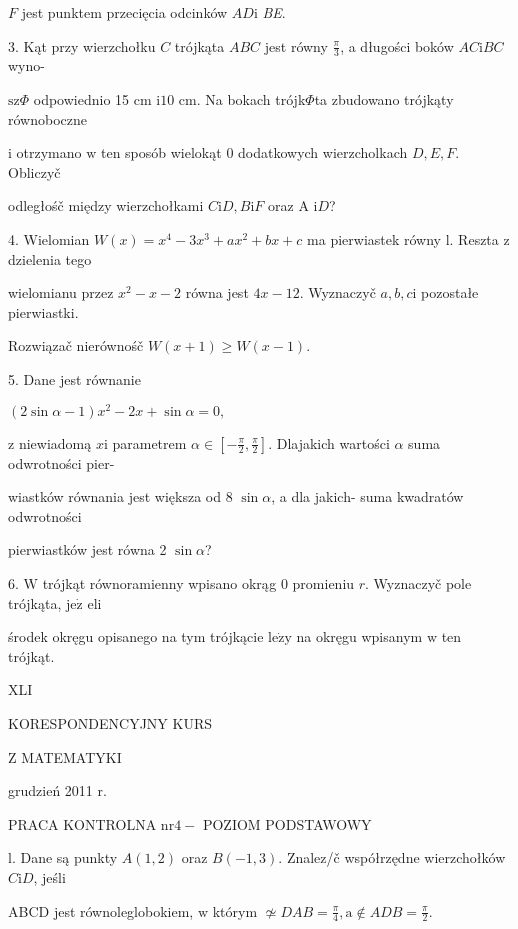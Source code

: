 \documentclass[a4paper,12pt]{article}
\begin{document}
$F$ jest punktem przecięcia odcinków $AD\mathrm{i}$ {\it BE}.

3. Kąt przy wierzchołku $C$ trójkąta $ABC$ jest równy $\displaystyle \frac{\pi}{3}$, a długości boków $AC\mathrm{i}BC$ wyno-

$\mathrm{s}\mathrm{z}\Phi$ odpowiednio 15 cm $\mathrm{i}10$ cm. Na bokach trójk$\Phi$ta zbudowano trójkąty równoboczne

$\mathrm{i}$ otrzymano $\mathrm{w}$ ten sposób wielokąt $0$ dodatkowych wierzcholkach $D, E, F$. Obliczyč

odległośč między wierzchołkami $C\mathrm{i}D, B\mathrm{i}F$ oraz A $\mathrm{i}D$?

4. Wielomian $W(x)=x^{4}-3x^{3}+ax^{2}+bx+c$ ma pierwiastek równy l. Reszta $\mathrm{z}$ dzielenia tego

wielomianu przez $x^{2}-x-2$ równa jest $4x-12$. Wyznaczyč $a, b, c\mathrm{i}$ pozostałe pierwiastki.

Rozwiązač nierównośč $W(x+1)\geq W(x-1).$

5. Dane jest równanie

$(2\sin\alpha-1)x^{2}-2x+\sin\alpha=0,$

$\mathrm{z}$ niewiadomą $x\mathrm{i}$ parametrem $\alpha\in [-\displaystyle \frac{\pi}{2},\frac{\pi}{2}]$. Dlajakich wartości $\alpha$ suma odwrotności pier-

wiastków równania jest większa od 8 $\sin\alpha$, a dla jakich- suma kwadratów odwrotności

pierwiastków jest równa 2 $\sin\alpha$?

6. $\mathrm{W}$ trójkąt równoramienny wpisano okrąg $0$ promieniu $r$. Wyznaczyč pole trójkąta, $\mathrm{j}\mathrm{e}\dot{\mathrm{z}}$ eli

środek okręgu opisanego na tym trójkącie $\mathrm{l}\mathrm{e}\dot{\mathrm{z}}\mathrm{y}$ na okręgu wpisanym $\mathrm{w}$ ten trójkąt.





XLI

KORESPONDENCYJNY KURS

Z MATEMATYKI

grudzień 2011 r.

PRACA KONTROLNA $\mathrm{n}\mathrm{r} 4-$ POZIOM PODSTAWOWY

l. Dane są punkty $A(1,2)$ oraz $B(-1,3)$. Znalez/č współrzędne wierzchołków $C\mathrm{i}D$, jeśli

ABCD jest równoleglobokiem, $\mathrm{w}$ którym $\displaystyle \not\simeq DAB=\frac{\pi}{4}, \displaystyle \mathrm{a}\not\in ADB=\frac{\pi}{2}.$
\end{document}
